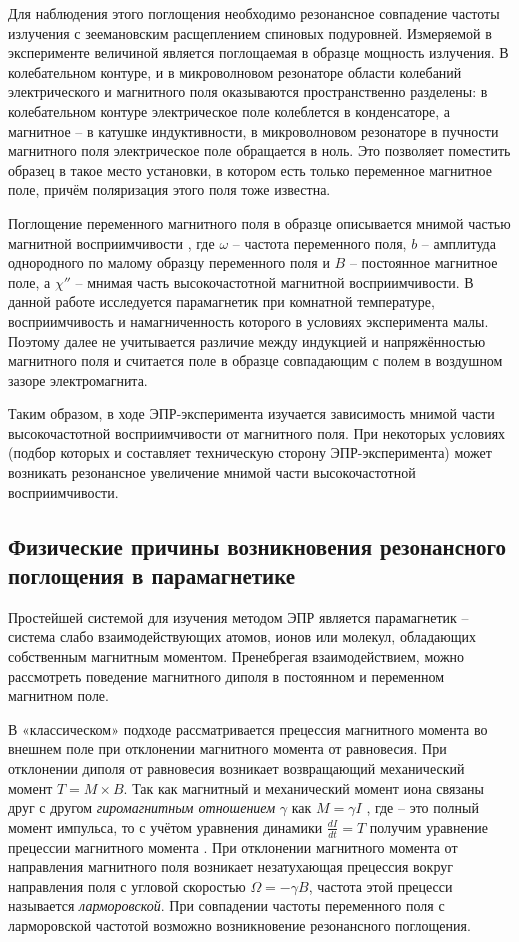 \documentclass[a4paper,12pt]{article}
\begin{document}
Для наблюдения этого поглощения необходимо резонансное совпадение частоты излучения с
зеемановским расщеплением спиновых подуровней. Измеряемой в эксперименте величиной является поглощаемая в образце мощность излучения. В колебательном контуре, и в микроволновом резонаторе области колебаний электрического и магнитного поля оказываются пространственно разделены: в колебательном контуре электрическое поле колеблется в конденсаторе, а магнитное -- в катушке индуктивности, в микроволновом резонаторе в пучности магнитного поля электрическое поле обращается в ноль. Это позволяет поместить образец в такое место установки, в котором есть только переменное магнитное поле, причём поляризация этого поля тоже известна. 

Поглощение переменного магнитного поля в образце описывается мнимой частью магнитной
восприимчивости  , где $\omega$ -- частота переменного поля, $b$ -- амплитуда однородного по малому образцу переменного поля и $B$ -- постоянное магнитное поле, а $\chi''$ -- мнимая часть высокочастотной магнитной восприимчивости. В данной работе исследуется парамагнетик при комнатной температуре, восприимчивость и намагниченность которого в условиях эксперимента малы. Поэтому далее не учитывается различие между индукцией и напряжённостью магнитного поля и считается поле в образце совпадающим с полем в воздушном зазоре электромагнита.

Таким образом, в ходе ЭПР-эксперимента изучается зависимость мнимой части высокочастотной восприимчивости от магнитного поля. При некоторых условиях (подбор
которых и составляет техническую сторону ЭПР-эксперимента) может возникать резонансное увеличение мнимой части высокочастотной восприимчивости.

\subsection{Физические причины возникновения резонансного поглощения в парамагнетике}
Простейшей системой для изучения методом ЭПР является парамагнетик -- система слабо
взаимодействующих атомов, ионов или молекул, обладающих собственным магнитным
моментом. Пренебрегая взаимодействием, можно рассмотреть поведение магнитного диполя в постоянном и переменном магнитном поле. 

В «классическом» подходе рассматривается прецессия магнитного момента во внешнем поле при отклонении магнитного момента от равновесия. При отклонении диполя от равновесия возникает возвращающий механический момент $T = M \times B$. Так как магнитный и механический момент иона связаны друг с другом \textit{гиромагнитным отношением} $\gamma$ как $M = \gamma I$ , где -- это полный момент импульса, то с учётом уравнения динамики
$\frac{dI}{dt} = T$ получим уравнение прецессии магнитного момента . При отклонении магнитного момента от направления магнитного поля возникает незатухающая прецессия вокруг направления поля с угловой скоростью $\Omega = -\gamma B$, частота этой прецесси называется \textit{ларморовской}. При совпадении частоты переменного поля с ларморовской частотой возможно возникновение резонансного поглощения.
\end{document}
